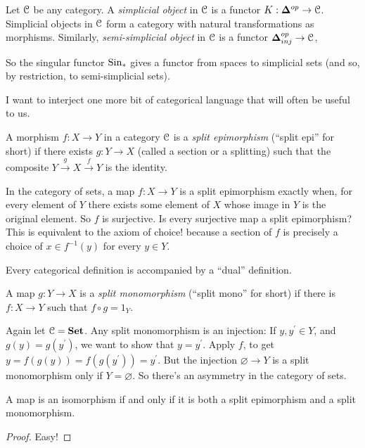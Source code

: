\begin{definition} Let $\mathcal C$ be any category. A {\em simplicial object} in $\mathcal C$ is a functor $K:{\mathbf{\Delta}}^{op}\to\mathcal C$. Simplicial objects in $\mathcal C$ form a category with natural transformations as morphisms. Similarly, {\em semi-simplicial object} in $\mathcal C$ is a functor ${\mathbf{\Delta}}_{inj}^{op}\to\mathcal C$,
\end{definition}

So the singular functor $\mathrm{Sin}_\ast$ gives a functor from spaces to simplicial sets (and so, by restriction, to semi-simplicial sets). 

I want to interject one more bit of categorical language that will often be useful to us. 

\begin{definition}
A morphism $f:X\to Y$ in a category $\mathcal C$ is a \textit{split epimorphism} (``split epi'' for short) if there exists $g:Y\to X$ (called a section or a splitting) such that the composite $Y\xrightarrow{g}X\xrightarrow{f}Y$ is the identity.
\end{definition}
\begin{example}
In the category of sets, a map $f:X\to Y$ is a split epimorphism exactly when, 
for every element of $Y$ there exists some element of $X$ whose image in $Y$ is the original element. So $f$ is surjective. Is every surjective map a split epimorphism? This is equivalent to the axiom of choice! because a section of $f$ is precisely a choice of $x\in f^{-1}(y)$ for every $y\in Y$.
\end{example}
Every categorical definition is accompanied by a ``dual'' definition. 
\begin{definition}
A map $g:Y\to X$ is a {\em split monomorphism} (``split mono'' for short) if there is $f:X\to Y$ such that $f\circ g=1_Y$.
\end{definition}
\begin{example}
Again let $\mathcal C=\mathbf{Set}$. Any split monomorphism is an injection: If $y,y^\prime\in Y$, and $g(y)=g(y^\prime)$, we want to show that $y=y^\prime$. Apply $f$, to get $y=f(g(y))=f(g(y^\prime))=y^\prime$. But the injection $\varnothing\to Y$ 
is a split monomorphism only if $Y=\varnothing$. So there's an asymmetry 
in the category of sets.
\end{example}
\begin{lemma}
A map is an isomorphism if and only if it is both a split epimorphism and a
split monomorphism.
\end{lemma}
\begin{proof}
Easy!
\end{proof}
